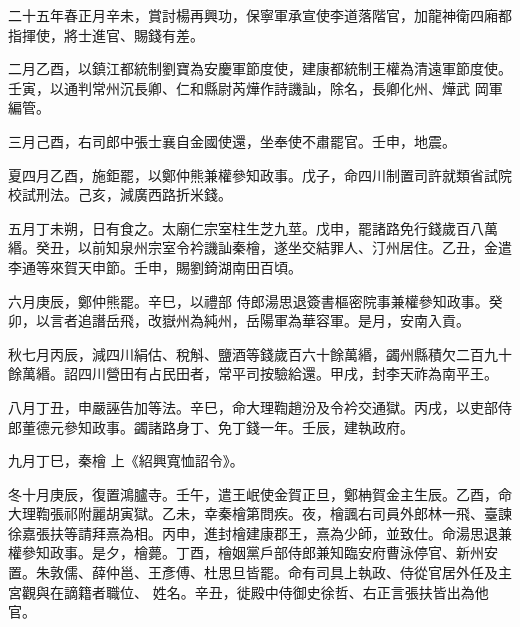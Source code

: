 \begin{pinyinscope}
 二十五年春正月辛未，賞討楊再興功，保寧軍承宣使李道落階官，加龍神衛四廂都指揮使，將士進官、賜錢有差。



 二月乙酉，以鎮江都統制劉寶為安慶軍節度使，建康都統制王權為清遠軍節度使。壬寅，以通判常州沉長卿、仁和縣尉芮燁作詩譏訕，除名，長卿化州、燁武
 岡軍編管。



 三月己酉，右司郎中張士襄自金國使還，坐奉使不肅罷官。壬申，地震。



 夏四月乙酉，施鉅罷，以鄭仲熊兼權參知政事。戊子，命四川制置司許就類省試院校試刑法。己亥，減廣西路折米錢。



 五月丁未朔，日有食之。太廟仁宗室柱生芝九莖。戊申，罷諸路免行錢歲百八萬緡。癸丑，以前知泉州宗室令衿譏訕秦檜，遂坐交結罪人、汀州居住。乙丑，金遣李通等來賀天申節。壬申，賜劉錡湖南田百頃。



 六月庚辰，鄭仲熊罷。辛巳，以禮部
 侍郎湯思退簽書樞密院事兼權參知政事。癸卯，以言者追譖岳飛，改嶽州為純州，岳陽軍為華容軍。是月，安南入貢。



 秋七月丙辰，減四川絹估、稅斛、鹽酒等錢歲百六十餘萬緡，蠲州縣積欠二百九十餘萬緡。詔四川營田有占民田者，常平司按驗給還。甲戌，封李天祚為南平王。



 八月丁丑，申嚴誣告加等法。辛巳，命大理鞫趙汾及令衿交通獄。丙戌，以吏部侍郎董德元參知政事。蠲諸路身丁、免丁錢一年。壬辰，建執政府。



 九月丁巳，秦檜
 上《紹興寬恤詔令》。



 冬十月庚辰，復置鴻臚寺。壬午，遣王岷使金賀正旦，鄭柟賀金主生辰。乙酉，命大理鞫張祁附麗胡寅獄。乙未，幸秦檜第問疾。夜，檜諷右司員外郎林一飛、臺諫徐嘉張扶等請拜熹為相。丙申，進封檜建康郡王，熹為少師，並致仕。命湯思退兼權參知政事。是夕，檜薨。丁酉，檜姻黨戶部侍郎兼知臨安府曹泳停官、新州安置。朱敦儒、薛仲邕、王彥傅、杜思旦皆罷。命有司具上執政、侍從官居外任及主宮觀與在謫籍者職位、
 姓名。辛丑，徙殿中侍御史徐哲、右正言張扶皆出為他官。




\end{pinyinscope}
